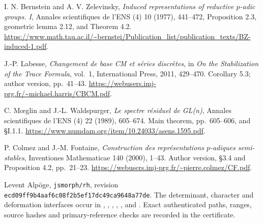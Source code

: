 I. N. Bernstein and A. V. Zelevinsky,
\emph{Induced representations of reductive \(p\)-adic groups. I},
Annales scientifiques de l'ENS (4) 10 (1977), 441--472,
Proposition 2.3, geometric lemma 2.12, and Theorem 4.2.
\url{https://www.math.tau.ac.il/~bernstei/Publication_list/publication_texts/BZ-induced-1.pdf}.

J.-P. Labesse, \emph{Changement de base CM et s\'eries discr\`etes},
in \emph{On the Stabilization of the Trace Formula}, vol.~1,
International Press, 2011, 429--470.
Corollary 5.3; author version, pp.~41--43.
\url{https://webusers.imj-prg.fr/~michael.harris/CBCM.pdf}.

C. M\oe glin and J.-L. Waldspurger,
\emph{Le spectre r\'esiduel de GL(n)},
Annales scientifiques de l'ENS (4) 22 (1989), 605--674.
Main theorem, pp.~605--606, and \S I.1.1.
\url{https://www.numdam.org/item/10.24033/asens.1595.pdf}.

P. Colmez and J.-M. Fontaine,
\emph{Construction des repr\'esentations \(p\)-adiques semi-stables},
Inventiones Mathematicae 140 (2000), 1--43.
Author version, \S3.4 and Proposition 4.2, pp.~21--23.
\url{https://webusers.imj-prg.fr/~pierre.colmez/CF.pdf}.

Levent Alp\"oge, \texttt{jsmorph/rh},
revision \texttt{ecd09ff9b4aaf6c08f2b5ef17dc49ca9648a77de}.
The determinant, character and deformation interfaces occur in
,
,
,
,
,
and .
Exact authenticated paths, ranges, source hashes and primary-reference
checks are recorded in the
 certificate.
